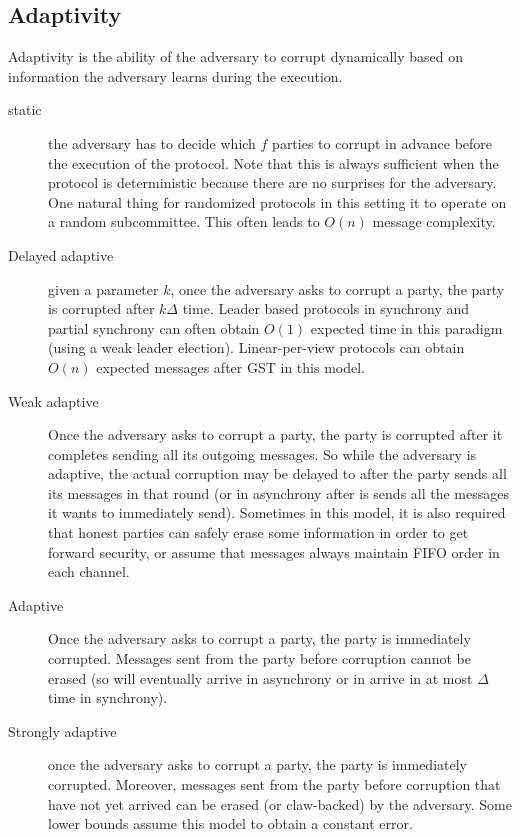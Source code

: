 \subsection{Adaptivity}

Adaptivity is the ability of the adversary to corrupt dynamically based on 
information the adversary learns during the execution. 

\begin{description}
    \item[static] the adversary has to decide which $f$ parties to corrupt in advance
     before the execution of the protocol. 
     Note that this is always sufficient when the protocol is deterministic because 
     there are no surprises for the adversary. One natural thing for randomized 
     protocols in this setting it to operate on a random subcommittee. This often leads to $O(n)$ message complexity.

    \item[Delayed adaptive] given a parameter $k$, once the adversary asks to corrupt a party,
     the party is corrupted after $k\Delta$ time. 
     Leader based protocols in synchrony and partial synchrony can often obtain $O(1)$ expected time in
     this paradigm (using a weak leader election). 
     Linear-per-view protocols can obtain $O(n)$ expected messages after GST in this model.

    \item[Weak adaptive] 
    Once the adversary asks to corrupt a party, the party is corrupted after 
    it completes sending all its outgoing messages. 
    So while the adversary is adaptive, the actual corruption may be delayed to after the party sends all its messages in 
    that round (or in asynchrony after is sends all the messages it wants to immediately send).
    Sometimes in this model, it is also required that honest parties can safely erase some information 
    in order to get forward security, or assume that messages always maintain FIFO order in each channel.

    \item[Adaptive] Once the adversary asks to corrupt a party,
     the party is immediately corrupted. 
     Messages sent from the party before corruption cannot be erased (so will eventually arrive in 
     asynchrony or in arrive in at most $\Delta$ time in synchrony).

     \item[Strongly adaptive] once the adversary asks to corrupt a party, 
     the party is immediately corrupted. 
     Moreover, messages sent from the party before corruption that have not yet arrived can be erased 
     (or claw-backed) by the adversary. 
     Some lower bounds assume this model to obtain a constant error. 
\end{description}

